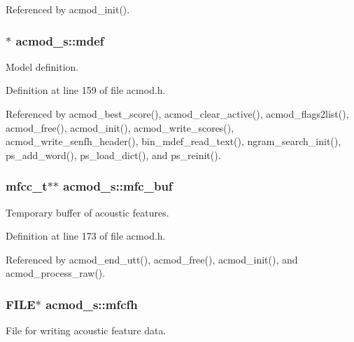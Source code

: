 Referenced by acmod\-\_\-init().

\subsubsection[{mdef}]{$\ast$ acmod\-\_\-s\-::mdef}\label{structacmod__s_a351548ff5547c29b4a684e10434a51dd}


Model definition. 



Definition at line 159 of file acmod.\-h.



Referenced by acmod\-\_\-best\-\_\-score(), acmod\-\_\-clear\-\_\-active(), acmod\-\_\-flags2list(), acmod\-\_\-free(), acmod\-\_\-init(), acmod\-\_\-write\-\_\-scores(), acmod\-\_\-write\-\_\-senfh\-\_\-header(), bin\-\_\-mdef\-\_\-read\-\_\-text(), ngram\-\_\-search\-\_\-init(), ps\-\_\-add\-\_\-word(), ps\-\_\-load\-\_\-dict(), and ps\-\_\-reinit().

\subsubsection[{mfc\-\_\-buf}]{\setlength{\rightskip}{0pt plus 5cm}mfcc\-\_\-t$\ast$$\ast$ acmod\-\_\-s\-::mfc\-\_\-buf}\label{structacmod__s_a5ded3dce0428a6ecba97b5d3486e7fa9}


Temporary buffer of acoustic features. 



Definition at line 173 of file acmod.\-h.



Referenced by acmod\-\_\-end\-\_\-utt(), acmod\-\_\-free(), acmod\-\_\-init(), and acmod\-\_\-process\-\_\-raw().

\subsubsection[{mfcfh}]{\setlength{\rightskip}{0pt plus 5cm}F\-I\-L\-E$\ast$ acmod\-\_\-s\-::mfcfh}\label{structacmod__s_a71903df6839f1f9fcfc2ef2a62a94f8e}


File for writing acoustic feature data. 



